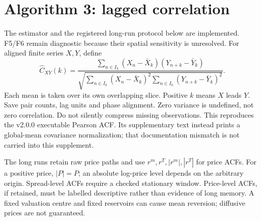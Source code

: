\documentclass[11pt,a4paper]{article}
\begin{document}
\section{Algorithm 3: lagged correlation}
The estimator and the registered long-run protocol below are implemented.
F5/F6 remain diagnostic because their spatial sensitivity is unresolved. For aligned finite series $X,Y$, define
\[
 \widehat C_{XY}(k)=
 \frac{\sum_{n\in I_k}(X_n-\bar X_k)(Y_{n+k}-\bar Y_k)}
 {\sqrt{\sum_{n\in I_k}(X_n-\bar X_k)^2
              \sum_{n\in I_k}(Y_{n+k}-\bar Y_k)^2}}.
\]
Each mean is taken over its own overlapping slice. Positive $k$ means $X$
leads $Y$. Save pair counts, lag units and phase alignment. Zero variance is
undefined, not zero correlation. Do not silently compress missing observations.
This reproduces the v2.0.0 executable Pearson ACF. Its supplementary text
instead prints a global-mean covariance normalization; that documentation
mismatch is not carried into this supplement.

The long runs retain raw price paths and use $r^m,r^T,|r^m|,|r^T|$ for
price ACFs. For a positive price, $|P|=P$; an absolute log-price level depends
on the arbitrary origin. Spread-level ACFs require a checked stationary
window. Price-level ACFs, if retained, must be labelled descriptive rather
than evidence of long memory. A fixed valuation centre and fixed reservoirs
can cause mean reversion; diffusive prices are not guaranteed.

\newpage
\end{document}
